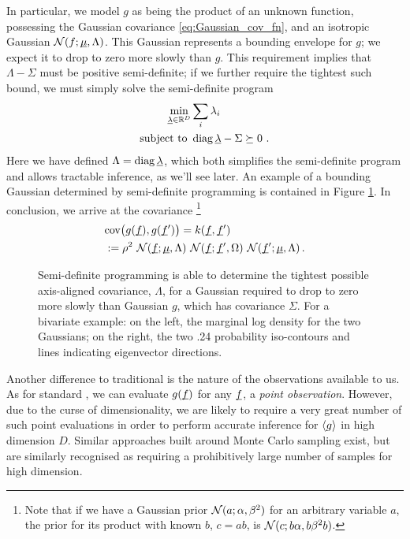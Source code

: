 \documentclass[twoside]{article}
\begin{document}
In particular, we model $g$ as being the product of an unknown function, possessing the Gaussian covariance \eqref{eq:Gaussian_cov_fn}, and an isotropic Gaussian $\mathcal{N}(f;\underline{\smash{\mu}},\Lambda)$. This Gaussian represents a bounding envelope for $g$; we expect it to drop to zero more slowly than $g$. This requirement implies that $\Lambda - \Sigma$ must be positive semi-definite; if we further require the tightest such bound, we must simply solve the semi-definite program
\begin{align}
 \min_{\underline{\smash{\lambda}}\in\mathbb{R}^D} & \sum_i \lambda_i\\
\text{subject to } & \operatorname{diag}{\underline{\smash{\lambda}}} - \Sigma \succeq 0~.
\end{align}
Here we have defined $\Lambda = \operatorname{diag} \underline{\smash{\lambda}}$, which both simplifies the semi-definite program and allows tractable inference, as we'll see later. An example of a bounding Gaussian determined by semi-definite programming is contained in Figure \ref{fig:bounding_ellipse}. In conclusion, we arrive at the covariance%
\footnote{Note that if we have a Gaussian prior $\mathcal{N}(a;\alpha,\beta^2)$ for an arbitrary variable $a$, the prior for its product with known $b$, $c = a b$, is $\mathcal{N}(c;b \alpha,b \beta^2 b)$.}
\begin{align}
 & \text{cov}\bigl(g(\underline{\smash{f}}), g(\underline{\smash{f}}')\bigr) = k(\underline{\smash{f}}, \underline{\smash{f}}')\nonumber\\ & := \rho^2~\mathcal{N}(\underline{\smash{f}};\underline{\smash{\mu}},\Lambda)~\mathcal{N}(\underline{\smash{f}};\underline{\smash{f}}',\Omega)~\mathcal{N}(\underline{\smash{f}}';\underline{\smash{\mu}},\Lambda)\,.
\end{align}

\begin{figure}
\caption{Semi-definite programming is able to determine the tightest possible axis-aligned covariance, $\Lambda$, for a Gaussian required to drop to zero more slowly than Gaussian $g$, which has covariance $\Sigma$. For a bivariate example: on the left, the marginal log density for the two Gaussians; on the right, the two .24 probability iso-contours and lines indicating eigenvector directions.}
\label{fig:bounding_ellipse}
\end{figure}

Another difference to traditional  is the nature of the observations available to us. As for standard , we can evaluate $g(\underline{\smash{f}})$ for any $\underline{\smash{f}}$, a \emph{point observation}. However, due to the curse of dimensionality, we are likely to require a very great number of such point evaluations in order to perform accurate inference for $\langle g \rangle$ in high dimension $D$. Similar approaches built around Monte Carlo sampling \citep{genz1992numerical} exist, but are similarly recognised as requiring a prohibitively large number of samples for high dimension. 
\end{document}
